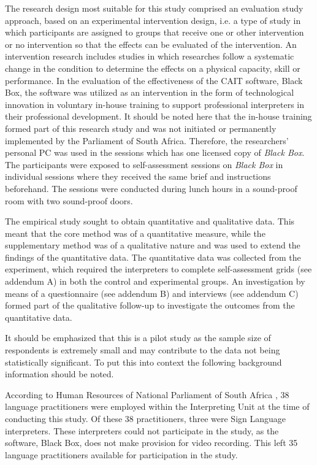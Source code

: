 \documentclass[output=paper]{langsci/langscibook}
\begin{document}
The research design most suitable for this study comprised an evaluation study approach, based on an experimental intervention design, i.e. a type of study in which participants are assigned to groups that receive one or other intervention or no intervention so that the effects can be evaluated of the intervention. An intervention research includes studies in which researches follow a systematic change in the condition to determine the effects on a physical capacity, skill or performance. In the evaluation of the effectiveness of the \textsc{CAIT} software, Black Box, the software was utilized as an intervention in the form of technological innovation in voluntary in-house training to support professional interpreters in their professional development. It should be noted here that the in-house training formed part of this research study and was not initiated or permanently implemented by the Parliament of South Africa. Therefore, the researchers’ personal PC was used in the sessions which has one licensed copy of \textit{Black Box}. The participants were exposed to self-assessment sessions on \textit{Black Box} in individual sessions where they received the same brief and instructions beforehand. The sessions were conducted during lunch hours in a sound-proof room with two sound-proof doors. 

The empirical study sought to obtain quantitative and qualitative data. This meant that the core method was of a quantitative measure, while the supplementary method was of a qualitative nature and was used to extend the findings of the quantitative data. The quantitative data was collected from the experiment, which required the interpreters to complete self-assessment grids (see addendum A) in both the control and experimental groups. An investigation by means of a questionnaire (see addendum B) and interviews (see addendum C) formed part of the qualitative follow-up to investigate the outcomes from the quantitative data.  

It should be emphasized that this is a pilot study as the sample size of respondents is extremely small and may contribute to the data not being statistically significant. To put this into context the following background information should be noted. 

According to Human Resources of National Parliament of South Africa \citep{Moorad2017}, 38 language practitioners were employed within the Interpreting Unit at the time of conducting this study. Of these 38 practitioners, three were Sign Language interpreters. These interpreters could not participate in the study, as the software, Black Box, does not make provision for video recording. This left 35 language practitioners available for participation in the study. 
\end{document}
